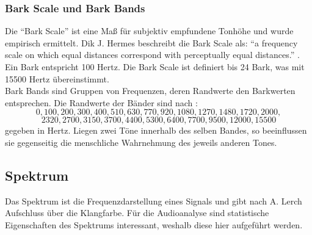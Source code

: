 \documentclass[11pt,a4paper]{article}
\begin{document}
\subsubsection{Bark Scale und Bark Bands}
Die ``Bark Scale'' ist eine Maß für subjektiv empfundene Tonhöhe und wurde empirisch ermittelt. Dik J. Hermes beschreibt die Bark Scale als: ``a frequency scale on which equal distances correspond with perceptually equal distances.'' \cite{BBands}. Ein Bark entspricht 100 Hertz. Die Bark Scale ist definiert bis 24 Bark, was mit 15500 Hertz übereinstimmt.\\
Bark Bands sind Gruppen von Frequenzen, deren Randwerte den Barkwerten entsprechen. Die Randwerte der Bänder sind nach \cite[S. 3]{smith1999bark}:
\[0, 100, 200, 300, 400, 510, 630, 770, 920, 1080, 1270, 1480, 1720, 2000, \]
\[2320, 2700, 3150, 3700, 4400, 5300, 6400, 7700, 9500, 12 000, 15 500\]
gegeben in Hertz. Liegen zwei Töne innerhalb des selben Bandes, so beeinflussen sie gegenseitig die menschliche Wahrnehmung des jeweils anderen Tones.

\subsection{Spektrum}
Das Spektrum ist die Frequenzdarstellung eines Signals und gibt nach A. Lerch \cite[S. 41]{lerch2012introduction} Aufschluss über die Klangfarbe. Für die Audioanalyse sind statistische Eigenschaften des Spektrums interessant, weshalb diese hier aufgeführt werden.
\end{document}
